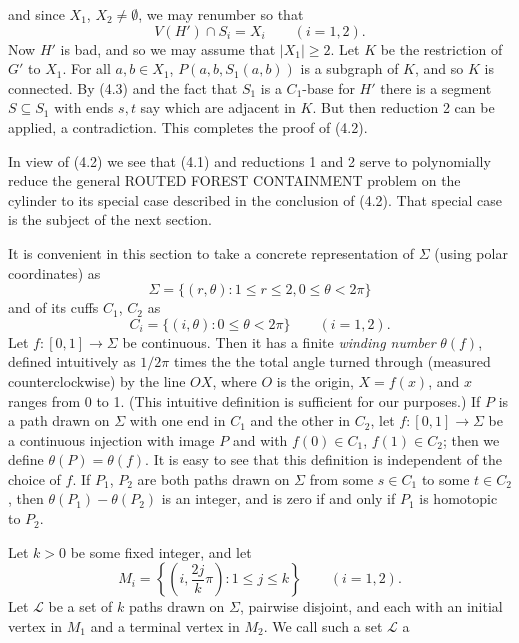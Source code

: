 \noindent and since $X_1$, $X_2 \ne \emptyset$, we may renumber so that
\begin{equation*}
V(H') \cap S_i = X_i \qquad (i = 1, 2).
\end{equation*}
Now $H'$ is bad, and so we may assume that $|X_1| \ge 2$. Let $K$ be the restriction of $G'$ to $X_1$. For all   $a, b \in X_1$, $P(a, b, S_1(a, b))$ is a subgraph of $K$, and so $K$ is connected. By (4.3) and the fact that $S_1$ is a $C_1$-base for $H'$ there is a segment $S \subseteq S_1$ with ends $s, t$ say which are adjacent in $K$. But then reduction 2 can be applied, a contradiction. This completes the proof of (4.2).

In view of (4.2) we see that (4.1) and reductions 1 and 2 serve to polynomially reduce the general ROUTED FOREST CONTAINMENT problem on the cylinder to its special case described in the conclusion of (4.2). That special case is the subject of the next section.


It is convenient in this section to take a concrete representation of $\Sigma$ (using polar coordinates) as
\begin{equation*}
\Sigma = \{(r, \theta): 1 \le r \le 2, 0 \le \theta < 2\pi\}
\end{equation*}
and of its cuffs $C_1$, $C_2$ as
\begin{equation*}
C_i = \{(i, \theta): 0 \le \theta < 2\pi\} \qquad (i = 1, 2).
\end{equation*}
Let $f: [0, 1] \to \Sigma$ be continuous. Then it has a finite \textit{winding number} $\theta(f)$, defined intuitively as $1/2\pi$ times the the total angle turned through (measured counterclockwise) by the line $OX$, where $O$ is the origin, $X = f(x)$, and $x$ ranges from 0 to 1. (This intuitive definition is sufficient for our purposes.) If $P$ is a path drawn on $\Sigma$ with one end in $C_1$ and the other in $C_2$, let $f: [0, 1] \to \Sigma$ be a continuous injection with image $P$ and with $f(0) \in C_1$, $f(1) \in C_2$; then we define $\theta(P) = \theta(f)$. It is easy to see that this definition is independent of the choice of $f$. If $P_1$, $P_2$ are both paths drawn on $\Sigma$ from some $s \in C_1$ to some $t \in C_2$, then $\theta(P_1) - \theta(P_2)$ is an integer, and is zero if and only if $P_1$ is homotopic to $P_2$.

Let $k > 0$ be some fixed integer, and let
\begin{equation*}
M_i = \left\{\left(i, \frac{2j}{k}\pi\right): 1 \le j \le k\right\} \qquad (i = 1, 2).
\end{equation*}
Let $\mathcal{L}$ be a set of $k$ paths drawn on $\Sigma$, pairwise disjoint, and each with an initial vertex in $M_1$ and a terminal vertex in $M_2$. We call such a set $\mathcal{L}$ a
